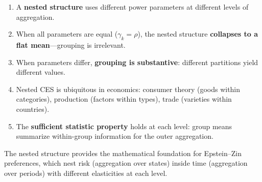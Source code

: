 \begin{calloutimportant}
\begin{enumerate}[label=(\roman*), leftmargin=2em]
    \item A \textbf{nested structure} uses different power parameters at different levels of aggregation.
    
    \item When all parameters are equal ($\gamma_k = \rho$), the nested structure \textbf{collapses to a flat mean}---grouping is irrelevant.
    
    \item When parameters differ, \textbf{grouping is substantive}: different partitions yield different values.
    
    \item Nested CES is ubiquitous in economics: consumer theory (goods within categories), production (factors within types), trade (varieties within countries).
    
    \item The \textbf{sufficient statistic property} holds at each level: group means summarize within-group information for the outer aggregation.
\end{enumerate}
\end{calloutimportant}

The nested structure provides the mathematical foundation for Epstein--Zin preferences, which nest risk (aggregation over states) inside time (aggregation over periods) with different elasticities at each level.
